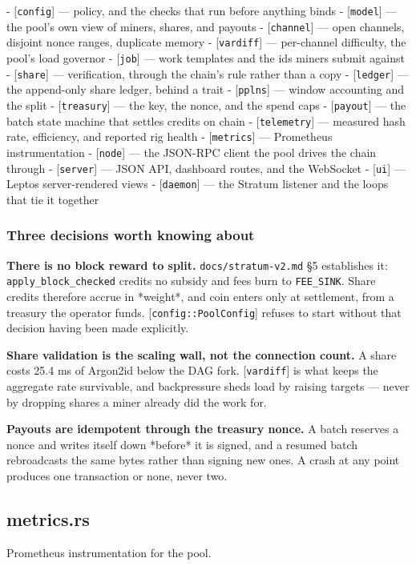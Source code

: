 \documentclass[11pt,a4paper]{article}
\begin{document}
- [\texttt{config}] — policy, and the checks that run before anything binds
- [\texttt{model}] — the pool's own view of miners, shares, and payouts
- [\texttt{channel}] — open channels, disjoint nonce ranges, duplicate memory
- [\texttt{vardiff}] — per-channel difficulty, the pool's load governor
- [\texttt{job}] — work templates and the ids miners submit against
- [\texttt{share}] — verification, through the chain's rule rather than a copy
- [\texttt{ledger}] — the append-only share ledger, behind a trait
- [\texttt{pplns}] — window accounting and the split
- [\texttt{treasury}] — the key, the nonce, and the spend caps
- [\texttt{payout}] — the batch state machine that settles credits on chain
- [\texttt{telemetry}] — measured hash rate, efficiency, and reported rig health
- [\texttt{metrics}] — Prometheus instrumentation
- [\texttt{node}] — the JSON-RPC client the pool drives the chain through
- [\texttt{server}] — JSON API, dashboard routes, and the WebSocket
- [\texttt{ui}] — Leptos server-rendered views
- [\texttt{daemon}] — the Stratum listener and the loops that tie it together

\subsubsection{Three decisions worth knowing about}

\textbf{There is no block reward to split.} \texttt{docs/stratum-v2.md} §5 establishes
it: \texttt{apply\_block\_checked} credits no subsidy and fees burn to \texttt{FEE\_SINK}.
Share credits therefore accrue in *weight*, and coin enters only at
settlement, from a treasury the operator funds. [\texttt{config::PoolConfig}]
refuses to start without that decision having been made explicitly.

\textbf{Share validation is the scaling wall, not the connection count.} A share
costs 25.4 ms of Argon2id below the DAG fork. [\texttt{vardiff}] is what keeps the
aggregate rate survivable, and backpressure sheds load by raising targets —
never by dropping shares a miner already did the work for.

\textbf{Payouts are idempotent through the treasury nonce.} A batch reserves a
nonce and writes itself down *before* it is signed, and a resumed batch
rebroadcasts the same bytes rather than signing new ones. A crash at any
point produces one transaction or none, never two.

\subsection{metrics.rs}
Prometheus instrumentation for the pool.
\end{document}

